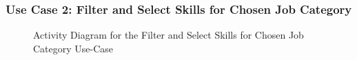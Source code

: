 \subsubsection{Use Case 2: Filter and Select Skills for Chosen Job Category} 
\begin{figure}[H]
    \centering
    \caption{ Activity Diagram for the Filter and Select Skills for Chosen Job Category Use-Case }
    \label{fig:UseCase2Sprint2_Activity_Diagram}
\end{figure}

